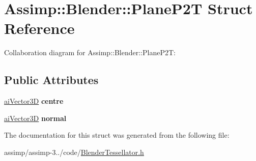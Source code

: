 \hypertarget{struct_assimp_1_1_blender_1_1_plane_p2_t}{\section{Assimp\+:\+:Blender\+:\+:Plane\+P2\+T Struct Reference}
\label{struct_assimp_1_1_blender_1_1_plane_p2_t}
}


Collaboration diagram for Assimp\+:\+:Blender\+:\+:Plane\+P2\+T\+:
\subsection*{Public Attributes}
\begin{DoxyCompactItemize}
\item 
\hypertarget{struct_assimp_1_1_blender_1_1_plane_p2_t_af5799e8bc296ad3c212f7201f03e83e3}{\hyperlink{structai_vector3_d}{ai\+Vector3\+D} {\bfseries centre}}\label{struct_assimp_1_1_blender_1_1_plane_p2_t_af5799e8bc296ad3c212f7201f03e83e3}

\item 
\hypertarget{struct_assimp_1_1_blender_1_1_plane_p2_t_a36ac8357fa796c5cff970c18b9559592}{\hyperlink{structai_vector3_d}{ai\+Vector3\+D} {\bfseries normal}}\label{struct_assimp_1_1_blender_1_1_plane_p2_t_a36ac8357fa796c5cff970c18b9559592}

\end{DoxyCompactItemize}


The documentation for this struct was generated from the following file\+:\begin{DoxyCompactItemize}
\item 
assimp/assimp-\/3../code/\hyperlink{_blender_tessellator_8h}{Blender\+Tessellator.\+h}\end{DoxyCompactItemize}
